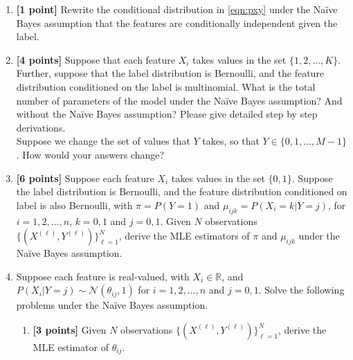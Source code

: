 \documentclass{article}
\newenvironment{soln}{
	\leavevmode\color{blue}\ignorespaces
}{}
\begin{document}
\begin{enumerate}
\item\textbf{[1 point]} Rewrite the conditional distribution in \eqref{eqn:pxy} under the Na{\"i}ve Bayes assumption that the features are conditionally independent given the label.\\
\begin{soln}

\end{soln}


\item\textbf{[4 points]} Suppose that each feature $X_i$ takes values in the set $\{1,2,...,K\}$. Further, suppose that the label distribution is Bernoulli, and the feature distribution conditioned on the label is multinomial. What is the total number of parameters of the model under the Na{\"i}ve Bayes assumption? And without the Na{\"i}ve Bayes assumption? Please give detailed step by step derivations.\\
Suppose we change the set of values that $Y$ takes, so that $Y\in \{0, 1, ..., M-1\}$. How would your answers  change? \\
\begin{soln}

\end{soln}


\item\textbf{[6 points]} Suppose each feature $X_i$ takes values in the set $\{0,1\}$. Suppose the label distribution is Bernoulli, and the feature distribution conditioned on label is also Bernoulli, with $\pi = P(Y=1)$ and $\mu_{ijk}=P(X_i=k|Y=j)$, for $i=1,2,...,n$, $k=0,1$ and $j=0,1$. Given $N$ observations $\{(X^{(\ell)},Y^{(\ell)})\}_{\ell=1}^N$, derive the MLE estimators of $\pi$ and $\mu_{ijk}$ under the Na{\"i}ve Bayes assumption. \\
\begin{soln}

\end{soln}


\item Suppose each feature is real-valued, with $X_i \in \mathbb{R}$, and $P(X_i|Y=j)\sim \mathcal{N}(\theta_{ij}, 1)$ for $i=1,2,...,n$ and $j=0,1$. Solve the following problems under the Na{\"i}ve Bayes assumption.
\begin{enumerate}
\item\textbf{[3 points]} Given $N$ observations $\{(X^{(\ell)},Y^{(\ell)})\}_{\ell=1}^N$, derive the MLE estimator of $\theta_{ij}$.\\
\begin{soln}


\end{soln}
\end{enumerate}
\end{enumerate}
\end{document}
